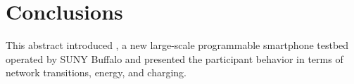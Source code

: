 \section{Conclusions}

This abstract introduced \PhoneLab{}, a new large-scale programmable smartphone
testbed operated by SUNY Buffalo and presented the participant behavior in terms
of network transitions, energy, and charging.
